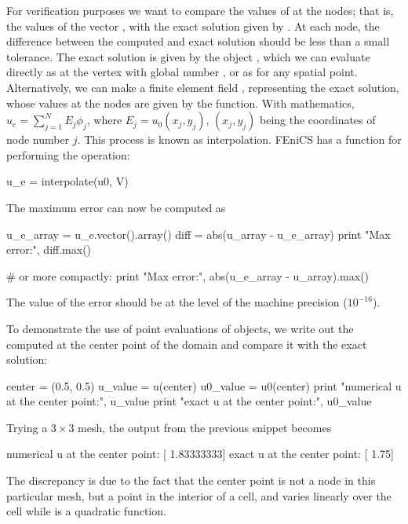 For verification purposes we want to compare the values of 
at the nodes; that is, the values of the vector , with
the exact solution given by . At each node, the difference
between the computed and exact solution should be less than a small
tolerance. The exact solution is given by the 
object , which we can evaluate directly as 
at the vertex with global number , or as  for any
spatial point.  Alternatively, we can make a finite element field
, representing the exact solution, whose values at the
nodes are given by the  function. With mathematics, $u_e
= \sum_{j=1}^N E_j\phi_j$, where $E_j=u_0(x_j,y_j)$, $(x_j,y_j)$
being the coordinates of node number $j$.  This process is known as
interpolation. FEniCS
has a function for performing the operation:
\begin{python}
u_e = interpolate(u0, V)
\end{python}
The maximum error can now be computed as
\begin{python}
u_e_array = u_e.vector().array()
diff = abs(u_array - u_e_array)
print "Max error:", diff.max()

# or more compactly:
print "Max error:", abs(u_e_array - u_array).max()
\end{python}
The value of the error should be at the level of the machine precision
($10^{-16}$).

To demonstrate the use of point evaluations of  objects,
we write out the computed  at the center point of the domain and
compare it with the exact solution:
\begin{python}
center = (0.5, 0.5)
u_value = u(center)
u0_value = u0(center)
print "numerical u at the center point:", u_value
print "exact     u at the center point:", u0_value
\end{python}
Trying a $3\times 3$ mesh, the output from the previous snippet becomes
\begin{progoutput}
numerical u at the center point: [ 1.83333333]
exact     u at the center point: [ 1.75]
\end{progoutput}
\noindent
The discrepancy is due to the fact that the center point is not a node in
this particular mesh, but a point in the interior of a cell, and 
varies linearly over the cell while  is a quadratic function.


